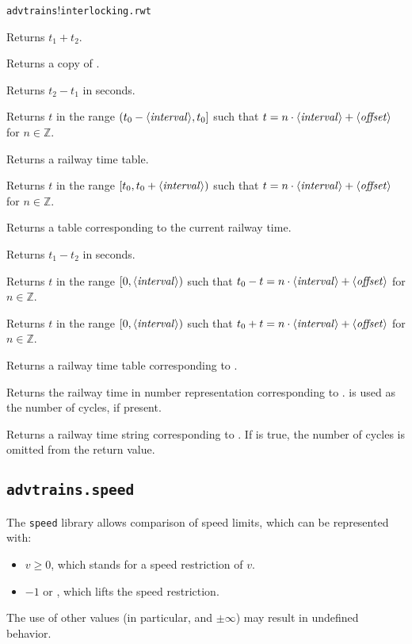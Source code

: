 \begin{apidoc}{\texttt{advtrains}!\texttt{interlocking.rwt}}
\item {} Returns \( t_1 + t_2 \).
\item {} Returns a copy of .
\item {} Returns \( t_2 - t_1 \) in seconds.
\item {} Returns $t$ in the range \( (t_0-\text{$\mathit{\langle}$\textrm{\textmd{\textit{interval}}}$\mathit{\rangle}$},t_0] \) such that \( t = n \cdot \text{$\mathit{\langle}$\textrm{\textmd{\textit{interval}}}$\mathit{\rangle}$} + \text{$\mathit{\langle}$\textrm{\textmd{\textit{offset}}}$\mathit{\rangle}$} \) for \( n \in \mathbb{Z} \).
\item {} Returns a railway time table.
\item {} Returns $t$ in the range \( [t_0,t_0+\text{$\mathit{\langle}$\textrm{\textmd{\textit{interval}}}$\mathit{\rangle}$}) \) such that \( t = n \cdot \text{$\mathit{\langle}$\textrm{\textmd{\textit{interval}}}$\mathit{\rangle}$} + \text{$\mathit{\langle}$\textrm{\textmd{\textit{offset}}}$\mathit{\rangle}$} \) for \( n \in \mathbb{Z} \).
\item {} Returns a table corresponding to the current railway time.
\item {} Returns \( t_1 - t_2 \) in seconds.
\item {} Returns $t$ in the range \( [0,\text{$\mathit{\langle}$\textrm{\textmd{\textit{interval}}}$\mathit{\rangle}$}) \) such that \( t_0 - t = n \cdot \text{$\mathit{\langle}$\textrm{\textmd{\textit{interval}}}$\mathit{\rangle}$} + \text{$\mathit{\langle}$\textrm{\textmd{\textit{offset}}}$\mathit{\rangle}$} \) for \( n \in \mathbb{Z} \).
\item {} Returns $t$ in the range \( [0,\text{$\mathit{\langle}$\textrm{\textmd{\textit{interval}}}$\mathit{\rangle}$}) \) such that \( t_0 + t = n \cdot \text{$\mathit{\langle}$\textrm{\textmd{\textit{interval}}}$\mathit{\rangle}$} + \text{$\mathit{\langle}$\textrm{\textmd{\textit{offset}}}$\mathit{\rangle}$} \) for \(n \in \mathbb{Z} \).
\item {} Returns a railway time table corresponding to .
\item {} Returns the railway time in number representation corresponding to .  is used as the number of cycles, if present.
\item {} Returns a railway time string corresponding to . If  is true, the number of cycles is omitted from the return value.
\end{apidoc}

\subsection{\texttt{advtrains.speed}}\label{s:tspeed}
The \texttt{speed} library allows comparison of speed limits, which can be represented with:
\begin{itemize}
\item $v \geq 0$, which stands for a speed restriction of $v$.
\item $-1$ or \luanil, which lifts the speed restriction.
\end{itemize}
The use of other values (in particular, \luanan{} and $\pm\infty$) may result in undefined behavior.

